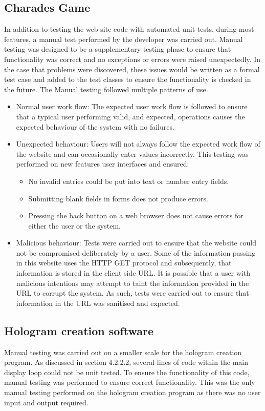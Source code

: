 \subsection{Charades Game}
In addition to testing the web site code with automated unit tests, during most features, a manual test performed by the developer was carried out. Manual testing was designed to be a supplementary testing phase to ensure that functionality was correct and no exceptions or errors were raised unexpectedly. In the case that problems were discovered, these issues would be written as a formal test case and added to the test classes to ensure the functionality is checked in the future. The Manual testing followed multiple patterns of use.
\begin{itemize}
	\item Normal user work flow: The expected user work flow is followed to ensure that a typical user performing valid, and expected, operations causes the expected behaviour of the system with no failures.
	
	\item Unexpected behaviour: Users will not always follow the expected work flow of the website and can occasionally enter values incorrectly. This testing was performed on new features user interfaces and ensured:
	\begin{itemize}
		\item No invalid entries could be put into text or number entry fields.
		\item Submitting blank fields in forms does not produce errors. 
		\item Pressing the back button on a web browser does not cause errors for either the user or the system.
	\end{itemize}
	
	\item Malicious behaviour: Tests were carried out to ensure that the website could not be compromised deliberately by a user. Some of the information passing in this website uses the HTTP GET protocol and subsequently, that information is stored in the client side URL. It is possible that a user with malicious intentions may attempt to taint the information provided in the URL to corrupt the system. As such, tests were carried out to ensure that information in the URL was sanitised and expected.
\end{itemize}


\subsection{Hologram creation software}
Manual testing was carried out on a smaller scale for the hologram creation program. As discussed in section 4.2.2.2, several lines of code within the main display loop could not be unit tested. To ensure the functionality of this code, manual testing was performed to ensure correct functionality. This was the only manual testing performed on the hologram creation program as there was no user input and output required.


